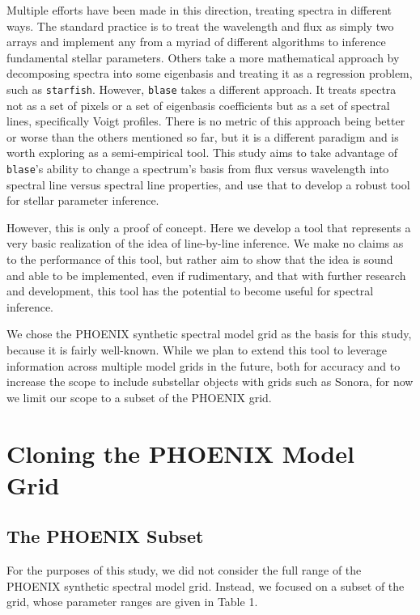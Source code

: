 \documentclass[twocolumn]{aastex631}
\begin{document}
Multiple efforts have been made in this direction, treating spectra in 
different ways. The standard practice is to treat the wavelength and flux as 
simply two arrays and implement any from a myriad of different algorithms to 
inference fundamental stellar parameters. Others take a more mathematical 
approach by decomposing spectra into some eigenbasis and treating it as a 
regression problem, such as \texttt{starfish}. However, \texttt{blase} takes 
a different approach. It treats spectra not as a set of pixels or a set of 
eigenbasis coefficients but as a set of spectral lines, specifically Voigt 
profiles. There is no metric of this approach being better or worse than the 
others mentioned so far, but it is a different paradigm and is worth 
exploring as a semi-empirical tool. This study aims to take advantage of 
\texttt{blase}'s ability to change a spectrum's basis from flux versus 
wavelength into spectral line versus spectral line properties, and use that 
to develop a robust tool for stellar parameter inference.

However, this is only a proof of concept. Here we develop a tool that 
represents a very basic realization of the idea of line-by-line inference. 
We make no claims as to the performance of this tool, but rather aim to show 
that the idea is sound and able to be implemented, even if rudimentary, and 
that with further research and development, this tool has the potential to 
become useful for spectral inference.

We chose the PHOENIX synthetic spectral model grid as the basis for this 
study, because it is fairly well-known. While we plan to extend this tool to 
leverage information across multiple model grids in the future, both for 
accuracy and to increase the scope to include substellar objects with grids
such as Sonora, for now we limit our scope to a subset of the PHOENIX grid.

\section{Cloning the PHOENIX Model Grid}
\subsection{The PHOENIX Subset}
For the purposes of this study, we did not consider the full range of the
PHOENIX synthetic spectral model grid. Instead, we focused on a subset of 
the grid, whose parameter ranges are given in Table 1.
\end{document}
